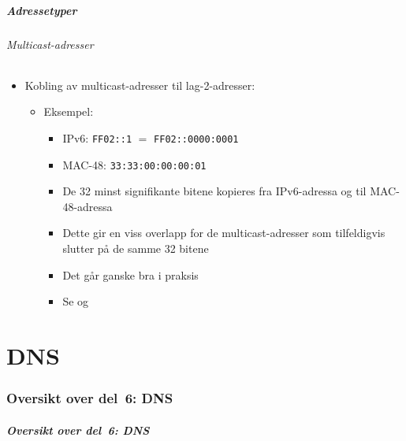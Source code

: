 \begin{frame}%
  \frametitle{Adressetyper}
  \framesubtitle{Multicast-adresser}
  \begin{itemize}[<+->]
  \item Kobling av multicast-adresser til lag-2-adresser:
    \begin{itemize}[<+->]
    \item Eksempel:
      \begin{itemize}[<+->]
      \item IPv6: \texttt{FF02::1} \(=\)
        \texttt{FF02::\alert<5->{0000}:\alert<5->{0001}}
      \item MAC-48:
        \texttt{33:33:\alert<5->{00}:\alert<5->{00}:\alert<5->{00}:\alert<5->{01}}
      \item De 32 minst signifikante bitene kopieres fra IPv6-adressa
        og til MAC-48-adressa
      \item Dette gir en viss overlapp for de multicast-adresser som
        tilfeldigvis slutter på de samme 32 bitene
      \item Det går ganske bra i praksis
      \item Se  og 
      \end{itemize}
    \end{itemize}
  \end{itemize}
\end{frame}

\part{DNS}

\begin{frame}
  \partpage
\end{frame}

\section*{Oversikt over del~6: DNS}
\begin{frame}[allowframebreaks]
  \frametitle{Oversikt over del~6: DNS}
    \tableofcontents%
\end{frame}

